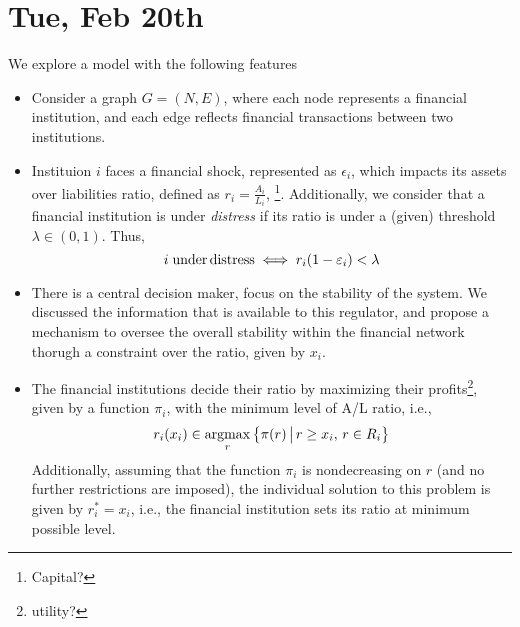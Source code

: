 \section{Tue, Feb 20th}
We explore a model with the following features
\begin{itemize}
\item[1.] Consider a graph $G=(N,E)$, where each node represents a financial institution, and each edge reflects financial transactions between two institutions. 

\item[2.] Instituion $i$ faces a financial shock, represented as $\epsilon_i$, which impacts its assets over liabilities ratio, defined as $r_i=\frac{A_i}{L_i}$, \footnote{Capital?}.  Additionally, we consider that a financial institution is under \emph{distress} if its ratio is under a (given) threshold $\lambda\in(0,1)$.  Thus,
\[i\;{\rm under\,distress}\iff r_i(1-\epsilon_i)<\lambda\]

\item[3.] There is a central decision maker, focus on the stability of the system.  We discussed the information that is available to this regulator, and propose a mechanism to oversee the overall stability within the financial network thorugh a constraint over the ratio, given by $x_i$.

\item[4.]  The financial institutions decide their ratio by maximizing their profits\footnote{utility?}, given by a function $\pi_i$, with the minimum level of A/L ratio, i.e.,
\[r_i(x_i)\in\argmax_r\lset \pi(r)\mset r\geq x_i,\,r\in R_i\rset\]
Additionally, assuming that the function $\pi_i$ is nondecreasing on $r$ (and no further restrictions are imposed), the individual solution to this problem is given by $r_i^*=x_i$, i.e., the financial institution sets its ratio at minimum possible level.


\end{itemize}
